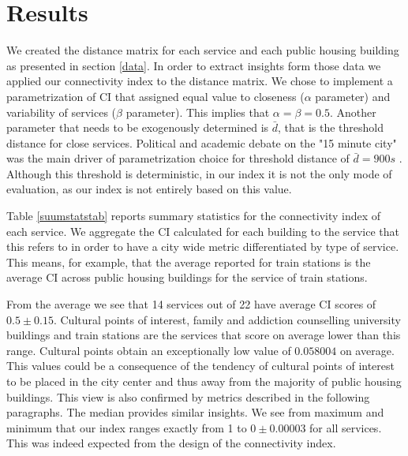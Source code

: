 \documentclass[11pt, titlepage]{article}
\newcommand{\Tolerance}{0.0001}%
\begin{document}
 \begin{figure}
 	\centering
 \end{figure}

\section{Results}
\label{res}

We created the distance matrix for each service and each public housing building as presented in section \ref{data}. In order to extract insights form those data we applied our connectivity index to the distance matrix. We chose to implement a parametrization of CI that assigned equal value to closeness ($\alpha$ parameter) and variability of services ($\beta$ parameter). This implies that $\alpha=\beta=0.5$. Another parameter that needs to be exogenously determined is $\bar{d}$, that is the threshold distance for close services. Political and academic debate on the "15 minute city" was the main driver of parametrization choice for threshold distance of $\bar{d}=900s$ \parencite{khavarian-garmsir_15-minute_2023}. Although this threshold is deterministic, in our index it is not the only mode of evaluation, as our index is not entirely based on this value.

Table \ref{suumstatstab} reports summary statistics for the connectivity index of each service. We aggregate the CI calculated for each building to the service that this refers to in order to have a city wide metric differentiated by type of service. This means, for example, that the average reported for train stations is the average CI across public housing buildings for the service of train stations.

From the average we see that 14 services out of 22 have average CI scores of $0.5\pm0.15$. Cultural points of interest, family and addiction counselling university buildings and train stations are the services that score on average lower than this range. Cultural points obtain an exceptionally low value of $0.058004$ on average. This values could be a consequence of the tendency of cultural points of interest to be placed in the city center and thus away from the majority of public housing buildings. This view is also confirmed by metrics described in the following paragraphs. The median provides similar insights. We see from maximum and minimum that our index ranges exactly from 1 to $0\pm0.00003$ for all services. This was indeed expected from the design of the connectivity index.
\end{document}
